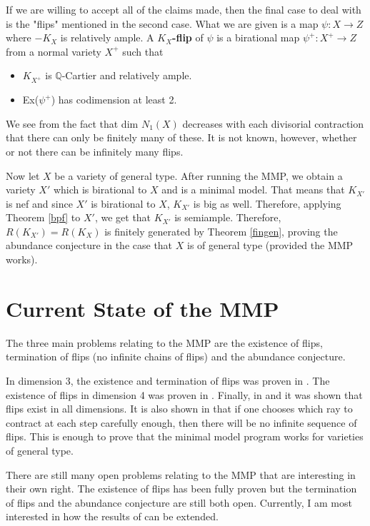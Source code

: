 \documentclass[a4paper]{article}
\numberwithin{theorem}{section}
\begin{document}
If we are willing to accept all of the claims made, then the final case to deal with is the "flips" mentioned in the second case. What we are given is a map $\psi: X \rightarrow Z$ where $-K_X$ is relatively ample. A \textbf{$K_X$-flip} of $\psi$ is a birational map $\psi^+: X^+ \rightarrow Z$ from a normal variety $X^+$ such that

\begin{itemize}
\item $K_{X^+}$ is $\mathbb{Q}$-Cartier and relatively ample.
\item Ex($\psi^+$) has codimension at least 2.
\end{itemize}

We see from the fact that dim $N_1(X)$ decreases with each divisorial contraction that there can only be finitely many of these. It is not known, however, whether or not there can be infinitely many flips.


Now let $X$ be a variety of general type. After running the MMP, we obtain a variety $X'$ which is birational to $X$ and is a minimal model. That means that $K_{X'}$ is nef and since $X'$ is birational to $X$, $K_{X'}$ is big as well. Therefore, applying Theorem \ref{bpf} to $X'$, we get that $K_{X'}$ is semiample. Therefore, $R(K_{X'}) = R(K_X)$ is finitely generated by Theorem \ref{fingen}, proving the abundance conjecture in the case that $X$ is of general type (provided the MMP works).


\section{Current State of the MMP}

The three main problems relating to the MMP are the existence of flips, termination of flips (no infinite chains of flips) and the abundance conjecture.

In dimension 3, the existence and termination of flips was proven in \cite{Mori88}. The existence of flips in dimension 4 was proven in \cite{Shokurov03}. Finally, in \cite{MR2359343} and \cite{MR2601039} it was shown that flips exist in all dimensions. It is also shown in \cite{MR2601039} that if one chooses which ray to contract at each step carefully enough, then there will be no infinite sequence of flips. This is enough to prove that the minimal model program works for varieties of general type.

There are still many open problems relating to the MMP that are interesting in their own right. The existence of flips has been fully proven but the termination of flips and the abundance conjecture are still both open. Currently, I am most interested in how the results of \cite{MR2601039} can be extended.



\end{document}
